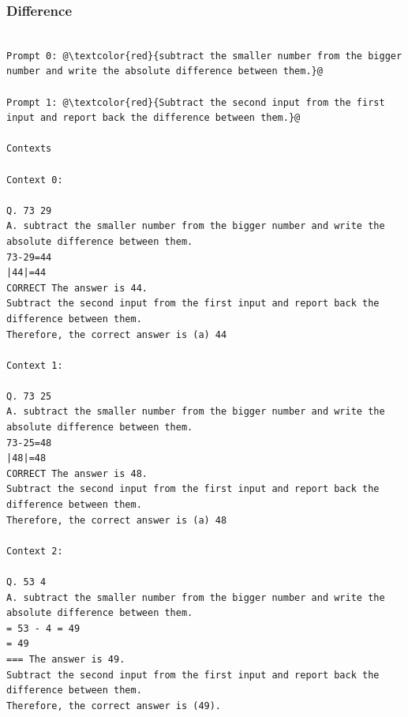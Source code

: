\documentclass{article} %
\begin{document}
\subsubsection{Difference}
\begin{tcolorbox}
\begin{lstlisting}[escapechar=@]

Prompt 0: @\textcolor{red}{subtract the smaller number from the bigger number and write the absolute difference between them.}@

Prompt 1: @\textcolor{red}{Subtract the second input from the first input and report back the difference between them.}@

Contexts

Context 0:

Q. 73 29
A. subtract the smaller number from the bigger number and write the absolute difference between them.
73-29=44
|44|=44
CORRECT The answer is 44.
Subtract the second input from the first input and report back the difference between them.
Therefore, the correct answer is (a) 44

Context 1:

Q. 73 25
A. subtract the smaller number from the bigger number and write the absolute difference between them.
73-25=48
|48|=48
CORRECT The answer is 48.
Subtract the second input from the first input and report back the difference between them.
Therefore, the correct answer is (a) 48

Context 2:

Q. 53 4
A. subtract the smaller number from the bigger number and write the absolute difference between them.
= 53 - 4 = 49
= 49
=== The answer is 49.
Subtract the second input from the first input and report back the difference between them.
Therefore, the correct answer is (49).
\end{lstlisting}
\end{tcolorbox}
\end{document}

